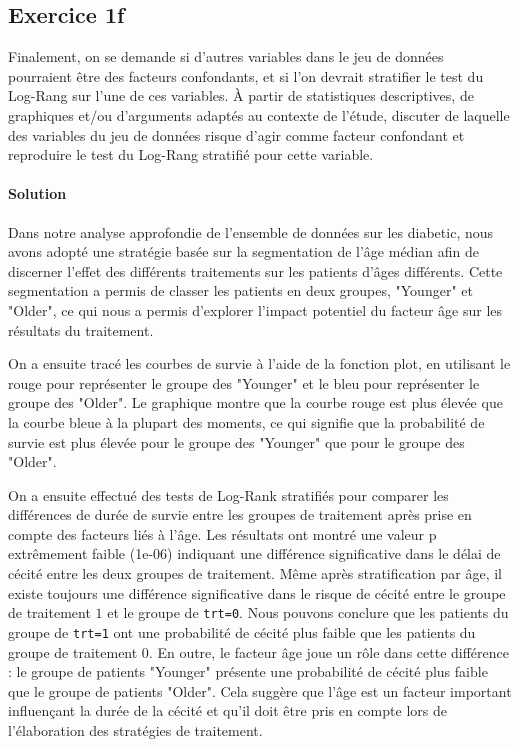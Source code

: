 \documentclass[../main.tex]{subfiles}
\begin{document}
\begin{CJK*}{UTF8}{gbsn}

\section*{Exercice 1f}
Finalement, on se demande si d'autres variables
dans le jeu de données pourraient être des facteurs confondants, et si l'on devrait stratifier le
test du Log-Rang sur l'une de ces variables. À partir de statistiques descriptives, de graphiques
et/ou d'arguments adaptés au contexte de l'étude, discuter de laquelle des variables du jeu de
données risque d'agir comme facteur confondant et reproduire le test du Log-Rang stratifié pour cette variable.
    
\paragraph{Solution}

Dans notre analyse approfondie de l'ensemble de données sur les diabetic, 
nous avons adopté une stratégie basée sur la segmentation de l'âge médian 
afin de discerner l'effet des différents traitements sur les patients d'âges différents. 
Cette segmentation a permis de classer les patients en deux groupes, "Younger" et "Older", 
ce qui nous a permis d'explorer l'impact potentiel du facteur âge sur les résultats du traitement.
    
On a ensuite tracé les courbes de survie à l'aide de la fonction plot, 
en utilisant le rouge pour représenter le groupe des "Younger" 
et le bleu pour représenter le groupe des "Older". 
Le graphique montre que la courbe rouge est plus élevée que la courbe bleue 
à la plupart des moments, ce qui signifie que la probabilité de survie est plus 
élevée pour le groupe des "Younger" que pour le groupe des "Older". 
    
On a ensuite effectué des tests de Log-Rank 
stratifiés pour comparer les différences de durée de survie 
entre les groupes de traitement après prise en compte des facteurs liés à l'âge.
Les résultats ont montré une valeur p extrêmement faible (1e-06) 
indiquant une différence significative dans le délai de cécité entre les deux groupes de traitement.
Même après stratification par âge, il existe toujours une différence 
significative dans le risque de cécité entre le groupe de traitement $1$
et le groupe de \texttt{trt=0}. Nous pouvons conclure que les patients 
du groupe de \texttt{trt=1} ont une probabilité de cécité plus faible que 
les patients du groupe de traitement $0$. 
En outre, le facteur âge joue un rôle dans cette différence : 
le groupe de patients "Younger"
présente une probabilité de cécité plus faible que le groupe de patients "Older". 
Cela suggère que l'âge est un facteur important influençant la durée 
de la cécité et qu'il doit être pris en compte lors de l'élaboration des stratégies de traitement.


\end{CJK*}
\end{document}
